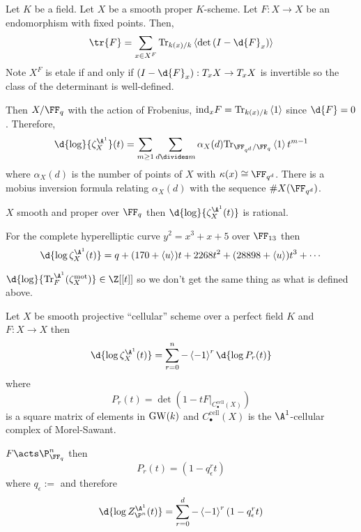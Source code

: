 \documentclass{article}
\begin{document}
\begin{theorem}[Hoyois]
Let $K$ be a field. Let $X$ be a smooth proper $K$-scheme. Let $F : X \to X$ be an endomorphism with \etale fixed points. Then,
\[ \tr{F} = \sum_{x \in X^F} \Tr_{k(x)/k} \left< \det{(I - \d{F}_x)} \right> \]
Note $X^F$ is etale if and only if $(I - \d{F}_x) : T_x X \to T_x X$ is invertible so the class of the determinant is well-defined.
\end{theorem}

\begin{example}
Then $X / \FF_q$ with the action of Frobenius, $\mathrm{ind}_x F = \mathrm{Tr}_{k(x) / k} \left< 1 \right>$ since $\d{F} = 0$. Therefore,
\[ \d{\log}{\zeta^{\A^1}_X}(t) = \sum_{m \ge 1} \sum_{d \divides m} \alpha_X(d) \Tr_{\FF_{q^d} / \FF_q} \left< 1 \right> t^{m-1} \]
where $\alpha_X(d)$ is the number of points of $X$ with $\kappa(x) \cong \FF_{q^d}$. There is a mobius inversion formula relating $\alpha_X(d)$ with the sequence $\# X(\FF_{q^d})$. 
\end{example}

\begin{theorem}[X, Hu]
$X$ smooth and proper over $\FF_q$ then $\d{\log}{\zeta^{\A^1}_X(t)}$ is rational. 
\end{theorem}

\begin{example}
For the complete hyperelliptic curve $y^2 = x^3 + x + 5$ over $\FF_{13}$ then
\[ \d{\log{\zeta_X^{\A^1}(t)}} = q + (170 + \left< u \right>) t + 2268 t^2 + (28898 + \left< u \right>) t^3 + \cdots \]
\end{example}

\begin{rmk}
$\d{\log}{\Tr^{\A^1}_F(\zeta_X^{\text{mot}})} \in \Z[[t]]$ so we don't get the same thing as what is defined above.
\end{rmk}

\begin{theorem}
Let $X$ be smooth projective ``cellular'' scheme over a perfect field $K$ and $F : X \to X$ then 
\[ \d{\log{\zeta_X^{\A^1}(t)}} = \sum_{r = 0}^n - \left< -1 \right>^r \d{\log{P_r(t)}} \]
where 
\[ P_r(t) = \det{(1 - t F|_{C_\bullet^{\text{cell}}(X)})} \]
is a square matrix of elements in $\mathrm{GW}(k)$ and ${C_\bullet^{\text{cell}}(X)}$ is the $\A^1$-cellular complex of Morel-Sawant. 
\end{theorem}

\begin{example}
$F \acts \P^n_{\FF_q}$ then
\[ P_r(t) = (1 - q_\epsilon^r t) \]
where $q_\epsilon := $ and therefore
\[ \d{\log{Z^{\A^1}_{\P^n}(t)}} = \sum_{r = 0}^d - \left< - 1 \right>^r (1 - q_\epsilon^r t) \]
\end{example}
\end{document}
